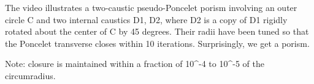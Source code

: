 The video illustrates a two-caustic pseudo-Poncelet porism involving an outer circle C and two internal caustics D1, D2, where D2 is a copy of D1 rigidly rotated about the center of C by 45 degrees. Their radii have been tuned so that the Poncelet transverse closes within 10 iterations. Surprisingly, we get a porism.

Note: closure is maintained within a fraction of 10^-4 to 10^-5 of the circumradius.